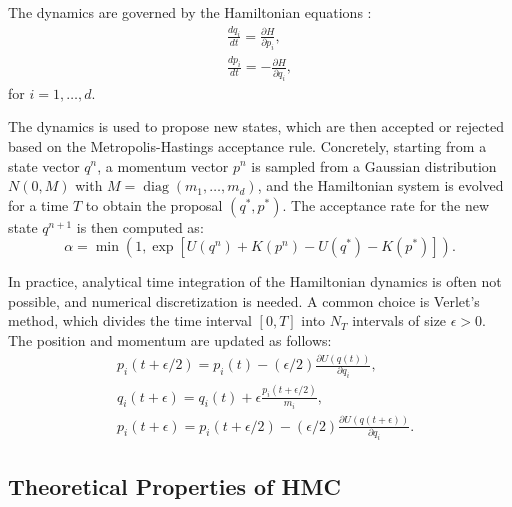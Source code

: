 \documentclass[a4paper, 12pt,oneside]{article}
\begin{document}
		The dynamics are governed by the Hamiltonian equations :
			\begin{gather}
			\frac{d q_i}{d t} =\frac{\partial H}{\partial p_i}, \\
			\frac{d p_i}{d t} =-\frac{\partial H}{\partial q_i},
			\end{gather}
			for $i=1, \ldots, d$.
		
			The dynamics is used to propose new states, which are then accepted or rejected based on the Metropolis-Hastings acceptance rule. Concretely, starting from a state vector $q^n$, a momentum vector $p^n$ is sampled from a Gaussian distribution $N(0, M)$ with $M=\operatorname{diag}\left(m_1, \ldots, m_d\right)$, and the Hamiltonian system is evolved for a time $T$ to obtain the proposal $(q^*, p^*)$. The acceptance rate for the new state $q^{n+1}$ is then computed as:
			\begin{equation}
				\alpha = \min\left(1, \exp \left[U\left(q^n\right)+K\left(p^n\right)-U\left(q^*\right)-K\left(p^*\right)\right]\right).
			\end{equation}

			In practice, analytical time integration of the Hamiltonian dynamics is often not possible, and numerical discretization is needed. A common choice is Verlet's method, which divides the time interval $[0, T]$ into $N_T$ intervals of size $\epsilon>0$. The position and momentum are updated as follows:
			\begin{align}
				& p_i(t+\epsilon / 2)=p_i(t)-(\epsilon / 2) \frac{\partial U(q(t))}{\partial q_i}, \\
				& q_i(t+\epsilon)=q_i(t)+\epsilon \frac{p_i(t+\epsilon / 2)}{m_i}, \\
				& p_i(t+\epsilon)=p_i(t+\epsilon / 2)-(\epsilon / 2) \frac{\partial U(q(t+\epsilon))}{\partial q_i}.
				\end{align}	
			
	\subsection{Theoretical Properties of HMC}
\end{document}
